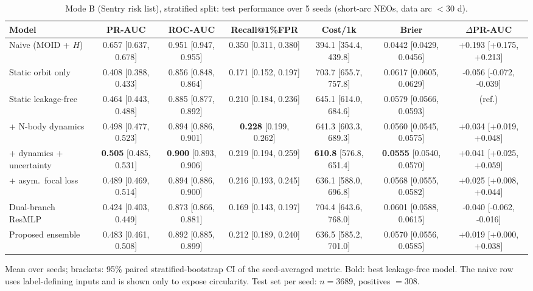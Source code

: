 \begin{table}[t]
\centering
\small
\caption{Mode B (Sentry risk list), stratified split: test performance over 5 seeds (short-arc NEOs, data arc $<30$ d).}
\label{tab:sentry_stratified_short_arc}
\begin{tabular}{lcccccc}
\toprule
Model & PR-AUC & ROC-AUC & Recall@1\%FPR & Cost/1k & Brier & $\Delta$PR-AUC \\
\midrule
Naive (MOID + $H$) & 0.657 \scriptsize{[0.637, 0.678]} & 0.951 \scriptsize{[0.947, 0.955]} & 0.350 \scriptsize{[0.311, 0.380]} & 394.1 \scriptsize{[354.4, 439.8]} & 0.0442 \scriptsize{[0.0429, 0.0456]} & +0.193 \scriptsize{[+0.175, +0.213]} \\
\midrule
Static orbit only & 0.408 \scriptsize{[0.388, 0.433]} & 0.856 \scriptsize{[0.848, 0.864]} & 0.171 \scriptsize{[0.152, 0.197]} & 703.7 \scriptsize{[655.7, 757.8]} & 0.0617 \scriptsize{[0.0605, 0.0629]} & -0.056 \scriptsize{[-0.072, -0.039]} \\
Static leakage-free & 0.464 \scriptsize{[0.443, 0.488]} & 0.885 \scriptsize{[0.877, 0.892]} & 0.210 \scriptsize{[0.184, 0.236]} & 645.1 \scriptsize{[614.0, 684.6]} & 0.0579 \scriptsize{[0.0566, 0.0593]} & (ref.) \\
+ N-body dynamics & 0.498 \scriptsize{[0.477, 0.523]} & 0.894 \scriptsize{[0.886, 0.901]} & \textbf{0.228} \scriptsize{[0.199, 0.262]} & 641.3 \scriptsize{[603.3, 689.3]} & 0.0560 \scriptsize{[0.0545, 0.0575]} & +0.034 \scriptsize{[+0.019, +0.048]} \\
+ dynamics + uncertainty & \textbf{0.505} \scriptsize{[0.485, 0.531]} & \textbf{0.900} \scriptsize{[0.893, 0.906]} & 0.219 \scriptsize{[0.194, 0.259]} & \textbf{610.8} \scriptsize{[576.8, 651.4]} & \textbf{0.0555} \scriptsize{[0.0540, 0.0570]} & +0.041 \scriptsize{[+0.025, +0.059]} \\
+ asym.\ focal loss & 0.489 \scriptsize{[0.469, 0.514]} & 0.894 \scriptsize{[0.886, 0.900]} & 0.216 \scriptsize{[0.193, 0.245]} & 636.1 \scriptsize{[588.0, 696.8]} & 0.0568 \scriptsize{[0.0555, 0.0582]} & +0.025 \scriptsize{[+0.008, +0.044]} \\
Dual-branch ResMLP & 0.424 \scriptsize{[0.403, 0.449]} & 0.873 \scriptsize{[0.866, 0.881]} & 0.169 \scriptsize{[0.143, 0.197]} & 704.4 \scriptsize{[643.6, 768.0]} & 0.0601 \scriptsize{[0.0588, 0.0615]} & -0.040 \scriptsize{[-0.062, -0.016]} \\
Proposed ensemble & 0.483 \scriptsize{[0.461, 0.508]} & 0.892 \scriptsize{[0.885, 0.899]} & 0.212 \scriptsize{[0.189, 0.240]} & 636.5 \scriptsize{[585.2, 701.0]} & 0.0570 \scriptsize{[0.0556, 0.0585]} & +0.019 \scriptsize{[+0.000, +0.038]} \\
\bottomrule
\end{tabular}
\par\vspace{2pt}\footnotesize Mean over seeds; brackets: 95\% paired stratified-bootstrap CI of the seed-averaged metric. Bold: best leakage-free model. The naive row uses label-defining inputs and is shown only to expose circularity. Test set per seed: $n=3689$, positives $=308$.
\end{table}

